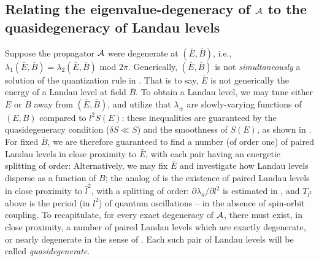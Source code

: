 \documentclass[aps, prb, showpacs, twocolumn, notitlepage, superscriptaddress]{revtex4-1}
\begin{document}
\subsection{Relating the eigenvalue-degeneracy of ${\cal A}$ to the quasidegeneracy of Landau levels}

Suppose the propagator ${\cal A}$ were degenerate at $(\bar{E},\bar{B})$, i.e., $\lambda_1(\bar{E},\bar{B})=\lambda_2(\bar{E},\bar{B})$ mod $2\pi$. Generically, $(\bar{E},\bar{B})$ is not \emph{simultaneously} a solution of the quantization rule in . That is to say, $\bar{E}$ is not generically the energy of a Landau level at field $\bar{B}$. To obtain a Landau level, we may tune either $E$ or $B$   away from $(\bar{E},\bar{B})$, and  utilize that  $\lambda_{\pm}$ are slowly-varying functions of $(E,B)$ compared to $l^2S(E)$:
these inequalities are guaranteed by the quasidegeneracy condition ($\delta S{\ll}S$) and the smoothness of $S(E)$, as shown in .  For fixed $\bar{B}$, we are therefore guaranteed to find a number (of order one) of paired Landau levels  in close proximity to $\bar{E}$, with each pair having an energetic splitting of order:
Alternatively, we may fix $\bar{E}$ and investigate how Landau levels disperse as a function of $B$; the analog of   is the existence of paired Landau levels in close proximity to $\bar{l}^2$, with a splitting of order:
$\partial \lambda_a/\partial l^2$ is estimated in , and
$T_{l^2}$ above is the period (in $l^2$) of quantum oscillations -- in the absence of spin-orbit coupling. To recapitulate, for every exact degeneracy of ${\cal A}$, there must exist, in close proximity, a number of paired Landau levels which are exactly degenerate, or nearly degenerate in the sense of . Each such pair of Landau levels will be called \textit{quasidegenerate}.  

\end{document}

